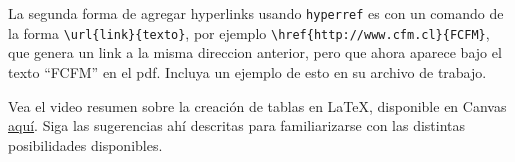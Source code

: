 \documentclass[11pt]{exam}
\begin{document}
\begin{questions}
\item La segunda forma de agregar hyperlinks usando \texttt{hyperref} es con un comando de la forma \verb|\url{link}{texto}|, por ejemplo \verb|\href{http://www.cfm.cl}{FCFM}|, que genera un link a la misma direccion anterior, pero que ahora aparece bajo el texto ``FCFM'' en el pdf. Incluya un ejemplo de esto en su archivo de trabajo.

\item Vea el video resumen sobre la creación de tablas en \LaTeX, disponible en Canvas \href{https://udec.instructure.com/courses/51022/pages/referencias-cruzadas}{aquí}. Siga las sugerencias ahí descritas para familiarizarse con las distintas posibilidades disponibles.

%
%
%
%
%
%
\end{questions}
\end{document}
